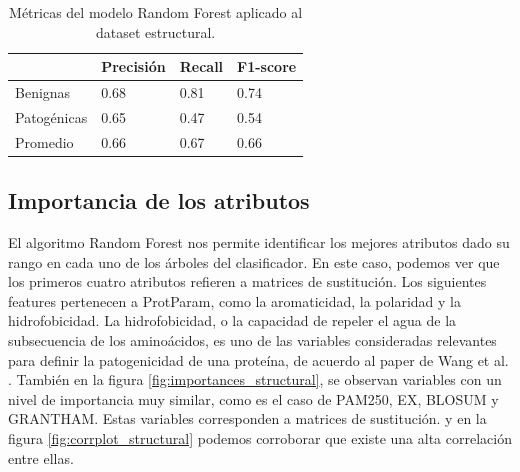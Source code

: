 \begin{table}[H]
\centering
\begin{tabular}{|l|l|l|l|}
\hline
              & Precisión & Recall & F1-score \\ \hline
Benignas      & 0.68      & 0.81   & 0.74     \\ \hline
Patogénicas   & 0.65      & 0.47   & 0.54     \\ \hline
Promedio      & 0.66      & 0.67   & 0.66     \\ \hline
\end{tabular}
\caption{Métricas del modelo Random Forest aplicado al dataset estructural.}
\label{structural_table}
\end{table}


\subsection{Importancia de los atributos}

El algoritmo Random Forest nos permite identificar los mejores atributos dado su rango en cada uno de los árboles del clasificador. En este caso, podemos ver que los primeros cuatro atributos refieren a matrices de sustitución. Los siguientes features pertenecen a ProtParam, como la aromaticidad, la polaridad y la hidrofobicidad. La hidrofobicidad, o la capacidad de repeler el agua de la subsecuencia de los aminoácidos, es uno de las variables consideradas relevantes para definir la patogenicidad de una proteína, de acuerdo al paper de Wang et al. \cite{Wang2016}. También en la figura \ref{fig:importances_structural}, se observan variables con un nivel de importancia muy similar, como es el caso de PAM250, EX, BLOSUM y GRANTHAM. Estas variables corresponden a matrices de sustitución. y en la figura \ref{fig:corrplot_structural} podemos corroborar que existe una alta correlación entre ellas.

\pagebreak

